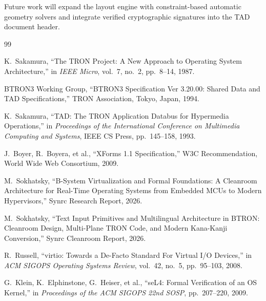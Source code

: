\documentclass[10pt,journal,compsoc,twocolumn]{article}
\begin{document}
Future work will expand the layout engine with constraint-based automatic geometry solvers and integrate verified cryptographic signatures into the TAD document header.

\begin{thebibliography}{99}

K.~Sakamura, ``The TRON Project: A New Approach to Operating System Architecture,'' in \emph{IEEE Micro}, vol.~7, no.~2, pp.~8--14, 1987.

BTRON3 Working Group, ``BTRON3 Specification Ver 3.20.00: Shared Data and TAD Specifications,'' TRON Association, Tokyo, Japan, 1994.

K.~Sakamura, ``TAD: The TRON Application Databus for Hypermedia Operations,'' in \emph{Proceedings of the International Conference on Multimedia Computing and Systems}, IEEE CS Press, pp.~145--158, 1993.

J.~Boyer, R.~Boyera, et al., ``XForms 1.1 Specification,'' W3C Recommendation, World Wide Web Consortium, 2009.

M.~Sokhatsky, ``B-System Virtualization and Formal Foundations: A Cleanroom Architecture for Real-Time Operating Systems from Embedded MCUs to Modern Hypervisors,'' Synrc Research Report, 2026.

M.~Sokhatsky, ``Text Input Primitives and Multilingual Architecture in BTRON: Cleanroom Design, Multi-Plane TRON Code, and Modern Kana-Kanji Conversion,'' Synrc Cleanroom Report, 2026.

R.~Russell, ``virtio: Towards a De-Facto Standard For Virtual I/O Devices,'' in \emph{ACM SIGOPS Operating Systems Review}, vol.~42, no.~5, pp.~95--103, 2008.

G.~Klein, K.~Elphinstone, G.~Heiser, et al., ``seL4: Formal Verification of an OS Kernel,'' in \emph{Proceedings of the ACM SIGOPS 22nd SOSP}, pp.~207--220, 2009.

\end{thebibliography}
\end{document}
